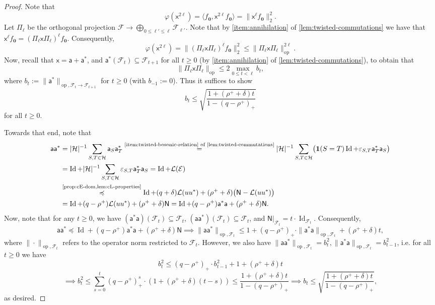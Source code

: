 \documentclass
[11pt,letterpaper]
{article}
\theoremstyle{definition}
\newcommand{\sfa}{\mathsf a}
\newcommand{\sfx}{\mathsf x}
\newcommand{\Num}{\mathsf N}
\newcommand{\eps}{\varepsilon}
\newcommand{\cF}{{\mathcal F}}
\newcommand{\cE}{{\mathcal E}}
\newcommand{\1}{\mathbf{1}}
\newcommand{\cH}{\mathcal H}
\newcommand{\Id}{\operatorname{Id}}
\newcommand{\seq}{\subseteq}
\newcommand{\cL}{\mathcal L}
\renewcommand{\geq}{\geqslant}
\renewcommand{\leq}{\leqslant}
\renewcommand{\preceq}{\preccurlyeq}
\begin{document}
\begin{proof}
    Note that 
    \[\varphi(\sfx^{2\ell}) = \langle f_{\bm{0}}, \sfx^{2\ell}f_{\bm{0}}\rangle = \|\sfx^\ell f_{\bm{0}}\|_2^2.\]
    Let $\Pi_\ell$ be the orthogonal projection $\cF\to\bigoplus_{0\leq \ell'\leq\ell}\cF_{\ell'}$. Note that by \cref{item:annihilation} of \cref{lem:twisted-commutations} we have that $\sfx^\ell f_{\bm{0}} = (\Pi_\ell \sfx\Pi_\ell)^\ell f_{\bm{0}}$. Consequently, 
    \[\varphi(\sfx^{2\ell}) = \|(\Pi_\ell \sfx\Pi_\ell)^\ell f_{\bm{0}}\|_2^2\leq \|\Pi_\ell \sfx\Pi_\ell\|^{2\ell}_{\operatorname{op}}.\]
    Now, recall that $\sfx = \sfa + \sfa^*$, and $\sfa^*(\cF_t)\seq\cF_{t + 1}$ for all $t\geq 0$ (by \cref{item:annihilation} of \cref{lem:twisted-commutations}), to obtain that
    \[\|\Pi_\ell \sfx\Pi_\ell\|_{\operatorname{op}}\leq 2\max_{0\leq t < \ell}b_t,\]
    where $b_t:= \|\sfa^*\|_{\operatorname{op}, \cF_t\to\cF_{t + 1}}$ for $t\geq 0$ (with $b_{-1}:= 0$). Thus it suffices to show
    \[b_t\leq\sqrt{\frac{1 + (\rho^+ + \delta) t}{1 - (q - \rho^+)_+}}\]
    for all $t\geq  0$.

    Towards that end, note that 
    \begin{align}\label{eq:aa-dom}
\sfa\sfa^*
&= |\cH|^{-1}\sum_{S,T\in\cH} \sfa_S\sfa_T^* \notag\overset{\text{\cref{item:twisted-bosonic-relation} of
\cref{lem:twisted-commutations}}}{=}
|\cH|^{-1}\sum_{S,T\in\cH}
\bigl(\1(S=T)\Id+\eps_{S,T}\sfa_T^*\sfa_S\bigr)\notag\\
&= \Id
+|\cH|^{-1}\sum_{S,T\in\cH}\eps_{S,T}\sfa_T^*\sfa_S\notag= \Id+\cL(\cE)\notag\\
&\overset{\text{\cref{prop:cE-dom,lem:cL-properties}}}{\preceq}
\Id+(q+\delta)\cL(uu^*)
+(\rho^++\delta)\bigl(\Num-\cL(uu^*)\bigr)\notag\\
&= \Id+(q-\rho^+)\cL(uu^*)
+(\rho^++\delta)\Num\notag = \Id+(q-\rho^+)\sfa^*\sfa
+(\rho^++\delta)\Num.
\end{align}
    Now, note that for any $t\geq  0$, we have $(\sfa^*\sfa)(\cF_t)\seq\cF_t$, $(\sfa\sfa^*)(\cF_t)\seq\cF_t$, and $\Num\vert_{\cF_t} = t\cdot\Id_{\cF_t}$. Consequently, 
    \[\sfa\sfa^*\preceq \Id+(q-\rho^+)\sfa^*\sfa
+(\rho^++\delta)\Num\implies\|\sfa\sfa^*\|_{\operatorname{op}, \cF_t}\leq 1 + (q - \rho^+)_+\cdot\|\sfa^*\sfa\|_{\operatorname{op}, \cF_t} + (\rho^+ + \delta)t,\]
    where $\|\cdot\|_{\operatorname{op}, \cF_t}$ refers to the operator norm restricted to $\cF_t$. However, we also have $\|\sfa\sfa^*\|_{\operatorname{op}, \cF_t} = b_t^2, \|\sfa^*\sfa\|_{\operatorname{op}, \cF_t} = b_{t - 1}^2$, i.e. for all $t\geq  0$ we have 
    \[b_t^2\leq (q - \rho^+)_+\cdot b_{t - 1}^2 + 1 + (\rho^+ + \delta)t\] 
    \[\implies b_t^2\leq\sum_{s = 0}^t(q - \rho^+)_+^s\cdot(1 + (\rho^+ + \delta)(t - s))\leq\frac{1 + (\rho^+ + \delta) t}{1 - (q - \rho^+)_+}\implies b_t\leq\sqrt{\frac{1 + (\rho^+ + \delta) t}{1 - (q - \rho^+)_+}},\]
    as desired.
\end{proof}
\end{document}
